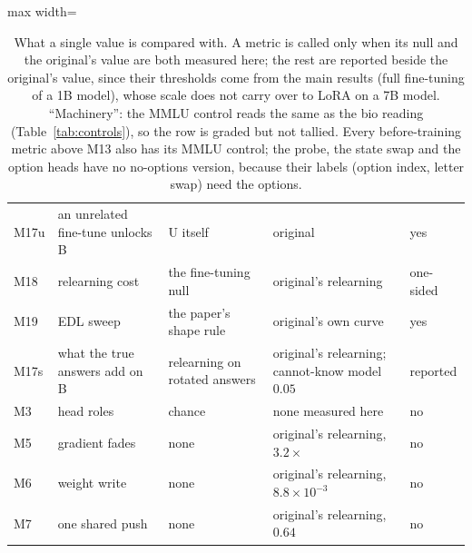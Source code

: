 \documentclass[11pt]{article}
\begin{document}
\begin{table}[!htbp]
\begin{adjustbox}{max width=\textwidth}
\begin{tabular}{@{}l>{\raggedright}p{4.6cm}>{\raggedright}p{4.0cm}>{\raggedright}p{4.6cm}l@{}}
M17u & an unrelated fine-tune unlocks B & U itself & original & yes \tabularnewline
M18 & relearning cost & the fine-tuning null & original's relearning & one-sided \tabularnewline
M19 & EDL sweep & the paper's shape rule & original's own curve & yes \tabularnewline
M17s & what the true answers add on B & relearning on rotated answers & original's relearning; cannot-know model $0.05$ & reported \tabularnewline
M3 & head roles & chance & none measured here & no \tabularnewline
M5 & gradient fades & none & original's relearning, $3.2\times$ & no \tabularnewline
M6 & weight write & none & original's relearning, $8.8\times10^{-3}$ & no \tabularnewline
M7 & one shared push & none & original's relearning, $0.64$ & no \tabularnewline
\bottomrule
\end{tabular}
\end{adjustbox}
\caption{What a single value is compared with. A metric is called only when its null and the
original's value are both measured here; the rest are reported beside the original's value, since
their thresholds come from the main results (full fine-tuning of a 1B model), whose scale does not
carry over to LoRA on a 7B model. ``Machinery'': the MMLU control reads the same as the bio reading
(Table~\ref{tab:controls}), so the row is graded but not tallied. Every before-training metric
above M13 also has its MMLU control; the probe, the state swap and the option heads have no
no-options version, because their labels (option index, letter swap) need the options.}
\label{tab:judged}
\end{table}
\end{document}
